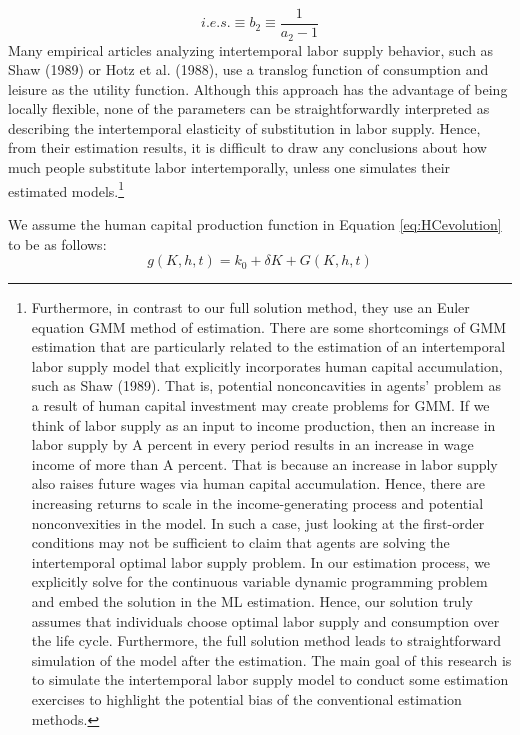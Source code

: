 \documentclass{article}
\begin{document}
\begin{equation*}
  i.e.s. \equiv b_2 \equiv \dfrac{1}{a_2-1}
\end{equation*}
Many empirical articles analyzing intertemporal labor supply behavior, such as Shaw (1989) or Hotz et al. (1988), use a translog function of consumption and leisure as the utility function. Although this approach has the advantage of being locally flexible, none of the parameters can be straightforwardly interpreted as describing the intertemporal elasticity of substitution in labor supply. Hence, from their estimation results, it is difficult to draw any conclusions about how much people substitute labor intertemporally, unless one simulates their estimated models.\footnote[6]{ Furthermore, in contrast to our full solution method, they use an Euler equation GMM method of estimation. There are some shortcomings of GMM estimation that are particularly related to the estimation of an intertemporal labor supply model that explicitly incorporates human capital accumulation, such as Shaw (1989). That is, potential nonconcavities in agents' problem as a result of human capital investment may create problems for GMM. If we think of labor supply as an input to income production, then an increase in labor supply by A percent in every period results in an increase in wage income of more than A percent. That is because an increase in labor supply also raises future wages via human capital accumulation. Hence, there are increasing returns to scale in the income-generating process and potential nonconvexities in the model. In such a case, just looking at the first-order conditions may not be sufficient to claim that agents are solving the intertemporal optimal labor supply problem. In our estimation process, we explicitly solve for the continuous variable dynamic programming problem and embed the solution in the ML estimation. Hence, our solution truly assumes that individuals choose optimal labor supply and consumption over the life cycle. Furthermore, the full solution method leads to straightforward simulation of the model after the estimation. The main goal of this research is to simulate the intertemporal labor supply model to conduct some estimation exercises to highlight the potential bias of the conventional estimation methods.} \par
We assume the human capital production function in Equation \eqref{eq:HCevolution} to be as follows:
\begin{equation} \tag{4a}
g(K,h,t) = k_0 + \delta K + G(K,h,t)
  \end{equation}
\end{document}
